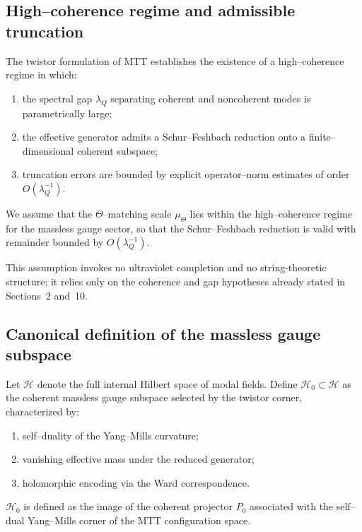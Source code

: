 \documentclass[11pt]{article}
\begin{document}
\subsection{High--coherence regime and admissible truncation}

The twistor formulation of MTT establishes the existence of a high--coherence
regime in which:
\begin{enumerate}
\item the spectral gap $\lambda_Q$ separating coherent and noncoherent modes
is parametrically large;
\item the effective generator admits a Schur--Feshbach reduction onto a
finite--dimensional coherent subspace;
\item truncation errors are bounded by explicit operator--norm estimates
of order $O(\lambda_Q^{-1})$.
\end{enumerate}

\begin{assumption}
We assume that the $\Theta$--matching scale $\mu_\Theta$ lies within the
high--coherence regime for the massless gauge sector, so that the
Schur--Feshbach reduction is valid with remainder bounded by
$O(\lambda_Q^{-1})$.
\end{assumption}

\begin{remark}
This assumption invokes no ultraviolet completion and no string-theoretic
structure; it relies only on the coherence and gap hypotheses already stated
in Sections~2 and~10.
\end{remark}

\subsection{Canonical definition of the massless gauge subspace}

Let $\mathcal H$ denote the full internal Hilbert space of modal fields.
Define $\mathcal H_0\subset\mathcal H$ as the coherent massless gauge subspace
selected by the twistor corner, characterized by:
\begin{enumerate}
\item self--duality of the Yang--Mills curvature;
\item vanishing effective mass under the reduced generator;
\item holomorphic encoding via the Ward correspondence.
\end{enumerate}

\begin{definition}
$\mathcal H_0$ is defined as the image of the coherent projector $P_0$
associated with the self--dual Yang--Mills corner of the MTT configuration
space.
\end{definition}
\end{document}
